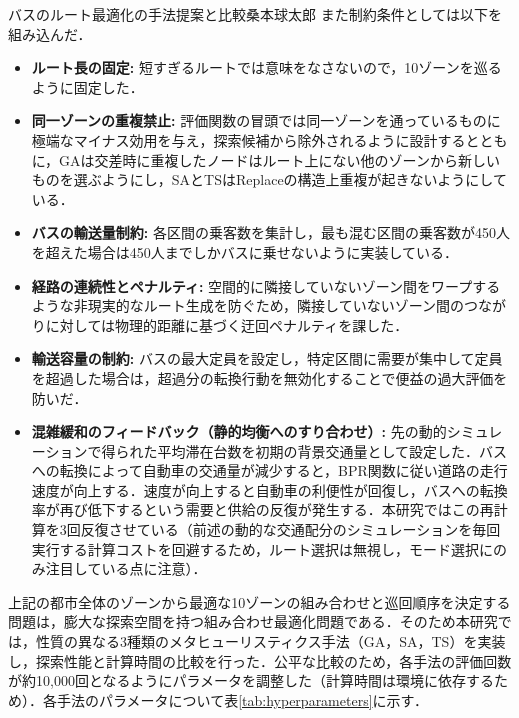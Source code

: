\begin{column}{バスのルート最適化の手法提案と比較}{桑本球太郎}
また制約条件としては以下を組み込んだ．
\begin{itemize}
    \item \textbf{ルート長の固定:} 短すぎるルートでは意味をなさないので，10ゾーンを巡るように固定した．
    \item \textbf{同一ゾーンの重複禁止:} 評価関数の冒頭では同一ゾーンを通っているものに極端なマイナス効用を与え，探索候補から除外されるように設計するとともに，GAは交差時に重複したノードはルート上にない他のゾーンから新しいものを選ぶようにし，SAとTSはReplaceの構造上重複が起きないようにしている．
    \item \textbf{バスの輸送量制約:} 各区間の乗客数を集計し，最も混む区間の乗客数が450人を超えた場合は450人までしかバスに乗せないように実装している．
    \item \textbf{経路の連続性とペナルティ:} 空間的に隣接していないゾーン間をワープするような非現実的なルート生成を防ぐため，隣接していないゾーン間のつながりに対しては物理的距離に基づく迂回ペナルティを課した．
    \item \textbf{輸送容量の制約:} バスの最大定員を設定し，特定区間に需要が集中して定員を超過した場合は，超過分の転換行動を無効化することで便益の過大評価を防いだ．
    \item \textbf{混雑緩和のフィードバック（静的均衡へのすり合わせ）:} 先の動的シミュレーションで得られた平均滞在台数を初期の背景交通量として設定した．バスへの転換によって自動車の交通量が減少すると，BPR関数に従い道路の走行速度が向上する．速度が向上すると自動車の利便性が回復し，バスへの転換率が再び低下するという需要と供給の反復が発生する．本研究ではこの再計算を3回反復させている（前述の動的な交通配分のシミュレーションを毎回実行する計算コストを回避するため，ルート選択は無視し，モード選択にのみ注目している点に注意）．
\end{itemize}

上記の都市全体のゾーンから最適な10ゾーンの組み合わせと巡回順序を決定する問題は，膨大な探索空間を持つ組み合わせ最適化問題である．そのため本研究では，性質の異なる3種類のメタヒューリスティクス手法（GA，SA，TS）を実装し，探索性能と計算時間の比較を行った．公平な比較のため，各手法の評価回数が約10,000回となるようにパラメータを調整した（計算時間は環境に依存するため）．各手法のパラメータについて表\ref{tab:hyperparameters}に示す．


\end{column}
